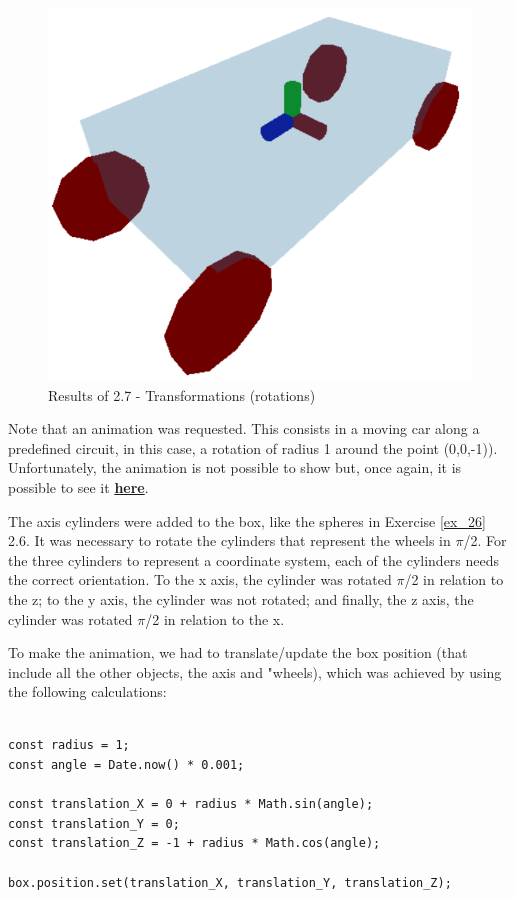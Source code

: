 \documentclass[12pt]{article}
\begin{document}
\begin{figure}[!h]
    \centering
        \includegraphics[width = \textwidth]{figs/ex_27.png}
        \caption{Results of 2.7 - Transformations (rotations)}
        \label{figs:ex_27}
\end{figure}

Note that an animation was requested. This consists in a moving car along a predefined circuit, in this case, a rotation of radius 1 around the point (0,0,-1)). Unfortunately, the animation is not possible to show but, once again, it is possible to see it \textbf{\href{https://github.com/goncalo-machado/VI}{here}}.\par

The axis cylinders were added to the box, like the spheres in Exercise \ref{ex_26} 2.6.\newline
It was necessary to rotate the cylinders that represent the wheels in $\pi$/2.\newline
For the three cylinders to represent a coordinate system, each of the cylinders needs the correct orientation. To the x axis, the cylinder was rotated $\pi$/2 in relation to the z; to the y axis, the cylinder was not rotated; and finally, the z axis, the cylinder was rotated $\pi$/2 in relation to the x.\par

To make the animation, we had to translate/update the box position (that include all the other objects, the axis and "wheels), which was achieved by using the following calculations:
\begin{lstlisting}

const radius = 1;
const angle = Date.now() * 0.001;

const translation_X = 0 + radius * Math.sin(angle);
const translation_Y = 0;
const translation_Z = -1 + radius * Math.cos(angle);

box.position.set(translation_X, translation_Y, translation_Z);

\end{lstlisting}
\end{document}
